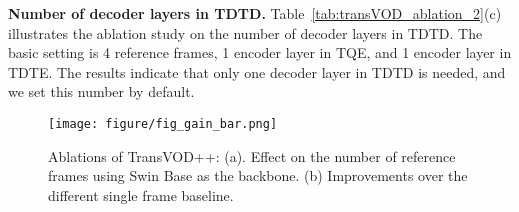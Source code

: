 \documentclass[10pt,journal,compsoc]{IEEEtran}
\begin{document}
\noindent \textbf{Number of decoder layers in TDTD.}
Table~\ref{tab:transVOD_ablation_2}(c) illustrates the ablation study on the number of decoder layers in TDTD. The basic setting is 4 reference frames, 1 encoder layer in TQE, and 1 encoder layer in TDTE. The results indicate that only one decoder layer in TDTD is needed, and we set this number by default.
\begin{figure}[t]
    \centering
    \texttt{[image: figure/fig\_gain\_bar.png]} 
    \caption{\small Ablations of TransVOD++: (a). Effect on the number of reference frames  using Swin Base as the backbone. (b) Improvements over the different single frame baseline.}
    \label{fig:transvod_plus}
\end{figure}


\begin{table*}[h!]
    \footnotesize
 \centering
 \caption{Ablation studies of TransVOD++ on ImageNet VID using  Swin Transformer Base (SwinB) as the backbone.}
\hfill
{}
\end{table*}
\end{document}
